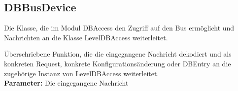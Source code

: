 \documentclass[entwurf.tex]{subfiles}
\begin{document}
	\subsection{DBBusDevice}
	\label{Class:DBBusDevice}
	Die Klasse, die im Modul DBAccess den Zugriff auf den Bus ermöglicht und Nachrichten an die Klasse LevelDBAccess weiterleitet. \\
	\begin{description}
	Überschriebene Funktion, die die eingegangene Nachricht dekodiert und als konkreten Request, konkrete Konfigurationsänderung oder DBEntry an die zugehörige Instanz von LevelDBAccess weiterleitet. \\
	\textbf{Parameter:} Die eingegangene Nachricht
	\end{description}
	
\end{document}
